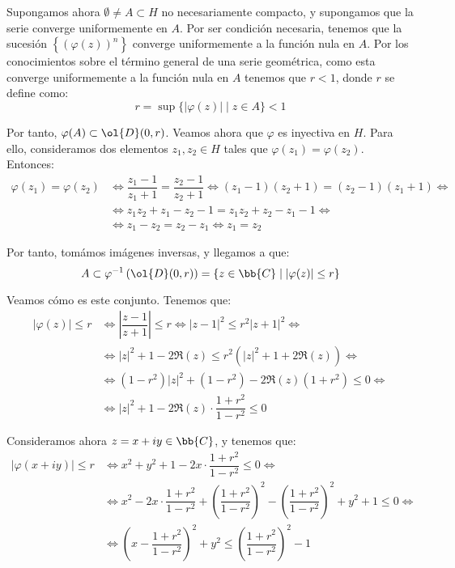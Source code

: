 \begin{ejercicio}
        Supongamos ahora $\emptyset\neq A\subset H$ no necesariamente compacto, y supongamos que la serie converge uniformemente en $A$. Por ser condición necesaria, tenemos que la sucesión $\left\{(\varphi(z))^n\right\}$ converge uniformemente a la función nula en $A$. Por los conocimientos sobre el término general de una serie geométrica, como esta converge uniformemente a la función nula en $A$ tenemos que $r<1$, donde $r$ se define como:
        \begin{equation*}
            r=\sup\{|\varphi(z)|\mid z\in A\}<1
        \end{equation*}

        Por tanto, $\varphi(A)\subset \ol{D}(0,r)$. Veamos ahora que $\varphi$ es inyectiva en $H$. Para ello, consideramos dos elementos $z_1,z_2\in H$ tales que $\varphi(z_1)=\varphi(z_2)$. Entonces:
        \begin{align*}
            \varphi(z_1)=\varphi(z_2) &\iff 
            \dfrac{z_1-1}{z_1+1} = \dfrac{z_2-1}{z_2+1}
            \iff (z_1-1)(z_2+1) = (z_2-1)(z_1+1)
            \iff\\&\iff  z_1z_2+z_1-z_2-1 = z_1z_2+z_2-z_1-1
            \iff\\&\iff z_1-z_2 = z_2-z_1
            \iff z_1 = z_2
        \end{align*}

        Por tanto, tomámos imágenes inversas, y llegamos a que:
        \begin{equation*}
            A\subset \varphi^{-1}\left(\ol{D}(0,r)\right) = \left\{z\in \bb{C}\mid |\varphi(z)|\leq r\right\}
        \end{equation*}

        Veamos cómo es este conjunto. Tenemos que:
        \begin{align*}
            |\varphi(z)|\leq r &\iff \left|\dfrac{z-1}{z+1}\right|\leq r
            \iff |z-1|^2\leq r^2|z+1|^2
            \iff\\&\iff |z|^2+1-2\Re(z)\leq r^2(|z|^2+1+2\Re(z))
            \iff\\&\iff (1-r^2)|z|^2+(1-r^2)-2\Re(z)(1+r^2)\leq 0
            \iff\\&\iff |z|^2+1-2\Re(z)\cdot \dfrac{1+r^2}{1-r^2}\leq 0
        \end{align*}

        Consideramos ahora $z=x+iy\in \bb{C}$, y tenemos que:
        \begin{align*}
            |\varphi(x+iy)|\leq r &\iff x^2+y^2+1-2x\cdot \dfrac{1+r^2}{1-r^2}\leq 0
            \iff\\&\iff x^2-2x\cdot \dfrac{1+r^2}{1-r^2} + \left(\dfrac{1+r^2}{1-r^2}\right)^2-\left(\dfrac{1+r^2}{1-r^2}\right)^2+y^2+1\leq 0
            \iff\\&\iff \left(x-\dfrac{1+r^2}{1-r^2}\right)^2+y^2\leq \left(\dfrac{1+r^2}{1-r^2}\right)^2-1
        \end{align*}


\end{ejercicio}
